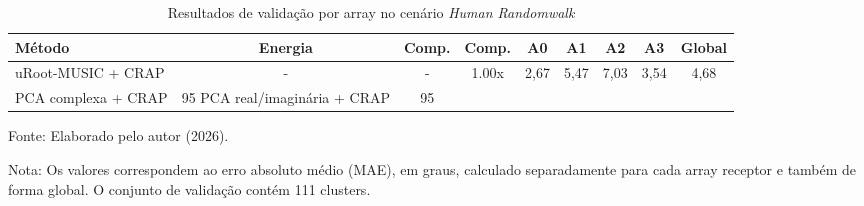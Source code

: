 \begin{table}[htbp]
\centering
\caption{Resultados de validação por array no cenário \textit{Human Randomwalk}}
\label{tab:validacao_human_randomwalk_por_array}
\begin{tabular}{lcccccccc}
\hline
\textbf{Método} & \textbf{Energia} & \textbf{Comp.} & \textbf{Comp.} & \textbf{A0} & \textbf{A1} & \textbf{A2} & \textbf{A3} & \textbf{Global} \\
\hline
uRoot-MUSIC + CRAP & - & - & 1.00x & 2,67 & 5,47 & 7,03 & 3,54 & 4,68 \\
PCA complexa + CRAP & 95%
PCA real/imaginária + CRAP & 95%
\hline
\end{tabular}

\vspace{0.2cm}
\raggedright
\small Fonte: Elaborado pelo autor (2026).

\small Nota: Os valores correspondem ao erro absoluto médio (MAE), em graus, calculado separadamente para cada array receptor e também de forma global. O conjunto de validação contém 111 clusters.
\end{table}